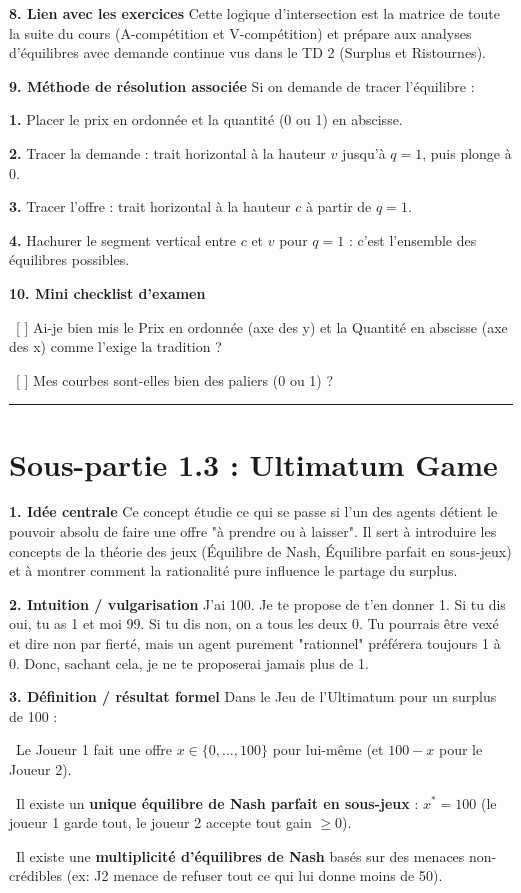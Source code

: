 \documentclass[11pt, a4paper]{report}
\begin{document}
\textbf{8. Lien avec les exercices}
Cette logique d'intersection est la matrice de toute la suite du cours (A-compétition et V-compétition) et prépare aux analyses d'équilibres avec demande continue vus dans le TD 2 (Surplus et Ristournes).

\textbf{9. Méthode de résolution associée}
Si on demande de tracer l'équilibre :
\par \textbf{1.} Placer le prix en ordonnée et la quantité (0 ou 1) en abscisse.
\par \textbf{2.} Tracer la demande : trait horizontal à la hauteur $v$ jusqu'à $q=1$, puis plonge à 0.
\par \textbf{3.} Tracer l'offre : trait horizontal à la hauteur $c$ à partir de $q=1$.
\par \textbf{4.} Hachurer le segment vertical entre $c$ et $v$ pour $q=1$ : c'est l'ensemble des équilibres possibles.

\textbf{10. Mini checklist d'examen}
\par \textbullet\ [ ] Ai-je bien mis le Prix en ordonnée (axe des y) et la Quantité en abscisse (axe des x) comme l'exige la tradition ?
\par \textbullet\ [ ] Mes courbes sont-elles bien des paliers (0 ou 1) ?

\vspace{1cm}\hrule\vspace{1cm}

\section{Sous-partie 1.3 : Ultimatum Game}

\textbf{1. Idée centrale}
Ce concept étudie ce qui se passe si l'un des agents détient le pouvoir absolu de faire une offre "à prendre ou à laisser". Il sert à introduire les concepts de la théorie des jeux (Équilibre de Nash, Équilibre parfait en sous-jeux) et à montrer comment la rationalité pure influence le partage du surplus.

\textbf{2. Intuition / vulgarisation}
J'ai 100\texteuro{}. Je te propose de t'en donner 1\texteuro{}. Si tu dis oui, tu as 1\texteuro{} et moi 99\texteuro{}. Si tu dis non, on a tous les deux 0\texteuro{}. Tu pourrais être vexé et dire non par fierté, mais un agent purement "rationnel" préférera toujours 1\texteuro{} à 0\texteuro{}. Donc, sachant cela, je ne te proposerai jamais plus de 1\texteuro{}.

\textbf{3. Définition / résultat formel}
Dans le Jeu de l'Ultimatum pour un surplus de 100 :
\par \textbullet\ Le Joueur 1 fait une offre $x \in \{0,...,100\}$ pour lui-même (et $100-x$ pour le Joueur 2).
\par \textbullet\ Il existe un \textbf{unique équilibre de Nash parfait en sous-jeux} : $x^* = 100$ (le joueur 1 garde tout, le joueur 2 accepte tout gain $\ge 0$).
\par \textbullet\ Il existe une \textbf{multiplicité d'équilibres de Nash} basés sur des menaces non-crédibles (ex: J2 menace de refuser tout ce qui lui donne moins de 50).
\end{document}
